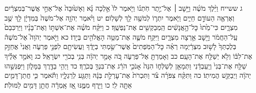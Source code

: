 \documentclass[twoside, openany, parskip=half, 11pt]{book}
\begin{document}
ג ששייח וַיֵּ֨לֶךְ מֹשֶׁ֜ה וַיָּ֣שׇׁב ׀ אֶל־יֶ֣תֶר חֹֽתְנ֗וֹ וַיֹּ֤אמֶר לוֹ֙ אֵ֣לְכָה נָּ֗א וְאָשׁ֙וּבָה֙ אֶל־אַחַ֣י אֲשֶׁר־בְּמִצְרַ֔יִם וְאֶרְאֶ֖ה הַעוֹדָ֣ם חַיִּ֑ים וַיֹּ֧אמֶר יִתְר֛וֹ לְמֹשֶׁ֖ה לֵ֥ךְ לְשָׁלֽוֹם׃ יט וַיֹּ֨אמֶר יְהֹוָ֤ה אֶל־מֹשֶׁה֙ בְּמִדְיָ֔ן לֵ֖ךְ שֻׁ֣ב מִצְרָ֑יִם כִּי־מֵ֙תוּ֙ כׇּל־הָ֣אֲנָשִׁ֔ים הַֽמְבַקְשִׁ֖ים אֶת־נַפְשֶֽׁךָ׃ כ וַיִּקַּ֨ח מֹשֶׁ֜ה אֶת־אִשְׁתּ֣וֹ וְאֶת־בָּנָ֗יו וַיַּרְכִּבֵם֙ עַֽל־הַחֲמֹ֔ר וַיָּ֖שׇׁב אַ֣רְצָה מִצְרָ֑יִם וַיִּקַּ֥ח מֹשֶׁ֛ה אֶת־מַטֵּ֥ה הָאֱלֹהִ֖ים בְּיָדֽוֹ׃ כא וַיֹּ֣אמֶר יְהֹוָה֮ אֶל־מֹשֶׁה֒ בְּלֶכְתְּךָ֙ לָשׁ֣וּב מִצְרַ֔יְמָה רְאֵ֗ה כׇּל־הַמֹּֽפְתִים֙ אֲשֶׁר־שַׂ֣מְתִּי בְיָדֶ֔ךָ וַעֲשִׂיתָ֖ם לִפְנֵ֣י פַרְעֹ֑ה וַאֲנִי֙ אֲחַזֵּ֣ק אֶת־לִבּ֔וֹ וְלֹ֥א יְשַׁלַּ֖ח אֶת־הָעָֽם׃ כב וְאָמַרְתָּ֖ אֶל־פַּרְעֹ֑ה כֹּ֚ה אָמַ֣ר יְהֹוָ֔ה בְּנִ֥י בְכֹרִ֖י יִשְׂרָאֵֽל׃ כג וָאֹמַ֣ר אֵלֶ֗יךָ שַׁלַּ֤ח אֶת־בְּנִי֙ וְיַֽעַבְדֵ֔נִי וַתְּמָאֵ֖ן לְשַׁלְּח֑וֹ הִנֵּה֙ אָנֹכִ֣י הֹרֵ֔ג אֶת־בִּנְךָ֖ בְּכֹרֶֽךָ׃ כד וַיְהִ֥י בַדֶּ֖רֶךְ בַּמָּל֑וֹן וַיִּפְגְּשֵׁ֣הוּ יְהֹוָ֔ה וַיְבַקֵּ֖שׁ הֲמִיתֽוֹ׃ כה וַתִּקַּ֨ח צִפֹּרָ֜ה צֹ֗ר וַתִּכְרֹת֙ אֶת־עׇרְלַ֣ת בְּנָ֔הּ וַתַּגַּ֖ע לְרַגְלָ֑יו וַתֹּ֕אמֶר כִּ֧י חֲתַן־דָּמִ֛ים אַתָּ֖ה לִֽי׃ כו וַיִּ֖רֶף מִמֶּ֑נּוּ אָ֚ז אָֽמְרָ֔ה חֲתַ֥ן דָּמִ֖ים לַמּוּלֹֽת׃
\end{document}
